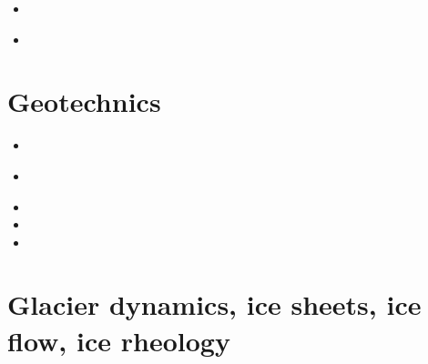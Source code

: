 \begin{small}
\begin{itemize}
 \\
 \\
 \\
 \\
 \\
 \\
\item[\twothousandtwentythree]  
 \\
\item[\twothousandtwentyfour]  
 \textbullet {} 
\end{itemize}
\end{small}

\section{Geotechnics}

\begin{small}
\begin{itemize}
\item[\nineteenninetynine] 
\item[\twothousandthree] 
 \\
\item[\twothousandfour] 
\item[\twothousandsix] 
\item[\twothousandfourteen] 
\end{itemize}
\end{small}

\section{Glacier dynamics, ice sheets, ice flow, ice rheology}

